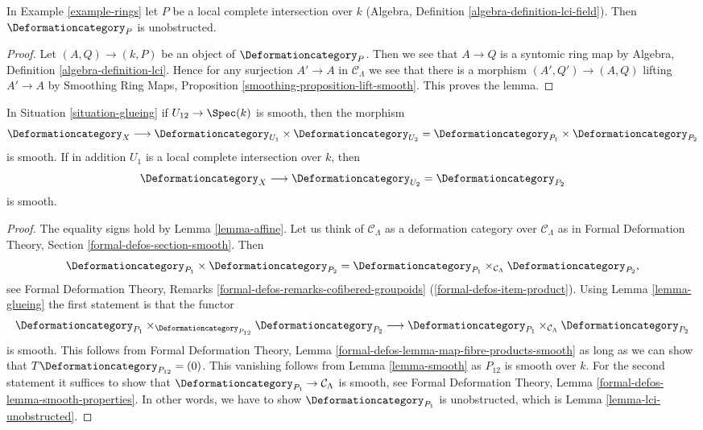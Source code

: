 \begin{lemma}
\label{lemma-lci-unobstructed}
In Example \ref{example-rings} let $P$ be a local complete
intersection over $k$ (Algebra, Definition \ref{algebra-definition-lci-field}).
Then $\Deformationcategory_P$ is unobstructed.
\end{lemma}

\begin{proof}
Let $(A, Q) \to (k, P)$ be an object of $\Deformationcategory_P$.
Then we see that $A \to Q$ is a syntomic ring map by
Algebra, Definition \ref{algebra-definition-lci}.
Hence for any surjection $A' \to A$ in $\mathcal{C}_\Lambda$
we see that there is a morphism $(A', Q') \to (A, Q)$
lifting $A' \to A$ by
Smoothing Ring Maps, Proposition \ref{smoothing-proposition-lift-smooth}.
This proves the lemma.
\end{proof}

\begin{lemma}
\label{lemma-glueing-smooth}
In Situation \ref{situation-glueing} if $U_{12} \to \Spec(k)$ is smooth,
then the morphism
$$
\Deformationcategory_X
\longrightarrow
\Deformationcategory_{U_1} \times \Deformationcategory_{U_2} =
\Deformationcategory_{P_1} \times \Deformationcategory_{P_2}
$$
is smooth. If in addition
$U_1$ is a local complete intersection over $k$, then
$$
\Deformationcategory_X
\longrightarrow
\Deformationcategory_{U_2} = \Deformationcategory_{P_2}
$$
is smooth.
\end{lemma}

\begin{proof}
The equality signs hold by Lemma \ref{lemma-affine}.
Let us think of $\mathcal{C}_\Lambda$ as a deformation
category over $\mathcal{C}_\Lambda$ as in
Formal Deformation Theory, Section \ref{formal-defos-section-smooth}.
Then
$$
\Deformationcategory_{P_1} \times \Deformationcategory_{P_2} =
\Deformationcategory_{P_1}
\times_{\mathcal{C}_\Lambda}
\Deformationcategory_{P_2},
$$
see Formal Deformation Theory, Remarks
\ref{formal-defos-remarks-cofibered-groupoids}
(\ref{formal-defos-item-product}).
Using
Lemma \ref{lemma-glueing}
the first statement is that the functor
$$
\Deformationcategory_{P_1}
\times_{\Deformationcategory_{P_{12}}}
\Deformationcategory_{P_2}
\longrightarrow
\Deformationcategory_{P_1}
\times_{\mathcal{C}_\Lambda}
\Deformationcategory_{P_2}
$$
is smooth. This follows from Formal Deformation Theory, Lemma
\ref{formal-defos-lemma-map-fibre-products-smooth} as long as
we can show that $T\Deformationcategory_{P_{12}} = (0)$.
This vanishing follows from Lemma \ref{lemma-smooth}
as $P_{12}$ is smooth over $k$.
For the second statement it suffices to show that
$\Deformationcategory_{P_1} \to \mathcal{C}_\Lambda$
is smooth, see Formal Deformation Theory, Lemma
\ref{formal-defos-lemma-smooth-properties}.
In other words, we have to show $\Deformationcategory_{P_1}$
is unobstructed, which is Lemma \ref{lemma-lci-unobstructed}.
\end{proof}

